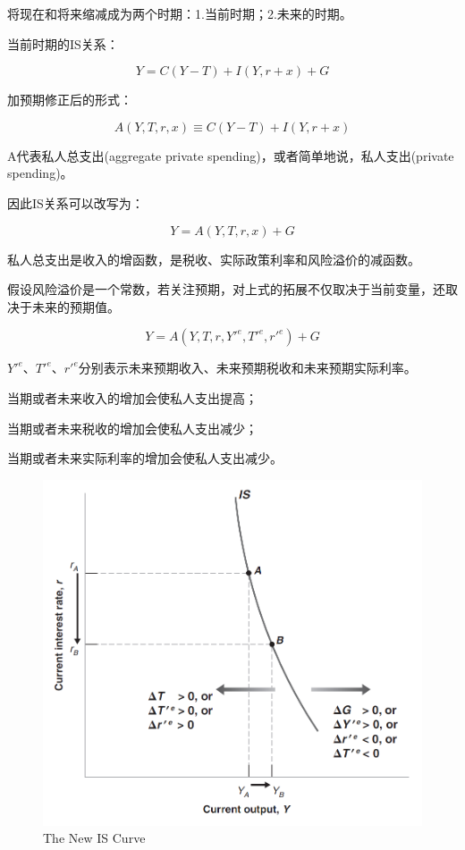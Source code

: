 \documentclass{article}
\begin{document}
将现在和将来缩减成为两个时期：1.当前时期；2.未来的时期。

当前时期的IS关系：

\[
Y=C(Y-T)+I(Y,r+x)+G
\]

加预期修正后的形式：

\[
A(Y,T,r,x)\equiv C(Y-T)+I(Y,r+x)
\]

A代表私人总支出(aggregate private spending)，或者简单地说，私人支出(private spending)。

因此IS关系可以改写为：

\[
Y=A(Y,T,r,x)+G
\]

私人总支出是收入的增函数，是税收、实际政策利率和风险溢价的减函数。

\hspace*{\fill}

假设风险溢价是一个常数，若关注预期，对上式的拓展不仅取决于当前变量，还取决于未来的预期值。

\[
Y=A(Y,T,r,Y'^e,T'^e,r'^e)+G
\]

$ Y'^e $、$ T'^e $、$ r'^e $分别表示未来预期收入、未来预期税收和未来预期实际利率。

当期或者未来收入的增加会使私人支出提高；

当期或者未来税收的增加会使私人支出减少；

当期或者未来实际利率的增加会使私人支出减少。

\begin{figure}[H] %
	\centering %
	\includegraphics[width=1\textwidth]{16_2} %
	\caption{The New IS Curve} %
	\label{Fig.main3} %
\end{figure}
\end{document}

